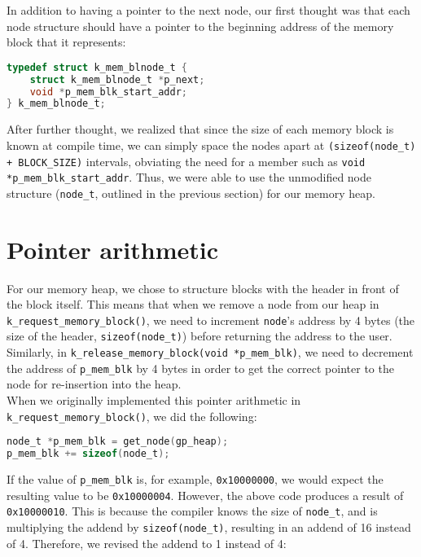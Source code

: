 \documentclass[12pt]{report}
\begin{document}
In addition to having a pointer to the next node, our first thought was that each node structure should have a pointer to the beginning address of the memory block that it represents:

\begin{minipage}{\textwidth}
\begin{lstlisting}[language=C]
typedef struct k_mem_blnode_t {
    struct k_mem_blnode_t *p_next;
    void *p_mem_blk_start_addr;
} k_mem_blnode_t;
\end{lstlisting}
\end{minipage}

After further thought, we realized that since the size of each memory block is known at compile time, we can simply space the nodes apart at \texttt{(sizeof(node_t) + BLOCK_SIZE)} intervals, obviating the need for a member such as \texttt{void *p_mem_blk_start_addr}. Thus, we were able to use the unmodified node structure (\texttt{node_t}, outlined in the previous section) for our memory heap.

\section{Pointer arithmetic}

For our memory heap, we chose to structure blocks with the header in front of the block itself. This means that when we remove a node from our heap in \texttt{k_request_memory_block()}, we need to increment \texttt{node}'s address by 4 bytes (the size of the header, \texttt{sizeof(node_t)}) before returning the address to the user. Similarly, in \texttt{k_release_memory_block(void *p_mem_blk)}, we need to decrement the address of \texttt{p_mem_blk} by 4 bytes in order to get the correct pointer to the node for re-insertion into the heap.\\

When we originally implemented this pointer arithmetic in \texttt{k_request_memory_block()}, we did the following:

\begin{minipage}{\textwidth}
\begin{lstlisting}[language=C]
node_t *p_mem_blk = get_node(gp_heap);
p_mem_blk += sizeof(node_t);
\end{lstlisting}
\end{minipage}

If the value of \texttt{p_mem_blk} is, for example, \texttt{0x10000000}, we would expect the resulting value to be \texttt{0x10000004}. However, the above code produces a result of \texttt{0x10000010}. This is because the compiler knows the size of \texttt{node_t}, and is multiplying the addend by \texttt{sizeof(node_t)}, resulting in an addend of 16 instead of 4. Therefore, we revised the addend to 1 instead of 4:
\end{document}
